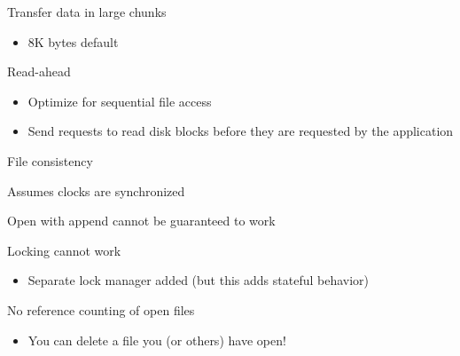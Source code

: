 \begin{slide}

	
	Transfer data in large chunks
	\begin{itemize}
		\item 8K bytes default
	\end{itemize} 
	\bigskip
	
	Read-ahead
	\begin{itemize}
		\item Optimize for sequential file access
		\item Send requests to read disk blocks before they are requested by the application
	\end{itemize}
	
\end{slide}

\begin{slide}

	
	File consistency
	\medskip
	
	Assumes clocks are synchronized
	\medskip
	
	Open with append cannot be guaranteed to work
	\medskip
	
	Locking cannot work
	\begin{itemize}
		\item Separate lock manager added (but this adds stateful behavior)
	\end{itemize}
	\medskip
	
	No reference counting of open files
	\begin{itemize}
		\item You can delete a file you (or others) have open!
	\end{itemize}

\end{slide}


